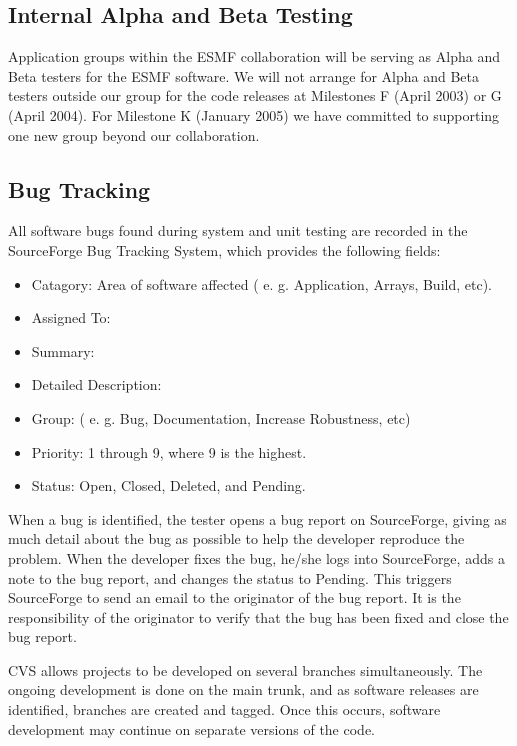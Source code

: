 \subsection{Internal Alpha and Beta Testing}

Application groups within the ESMF collaboration will be serving as Alpha 
and Beta testers for the ESMF software.  We will not arrange for Alpha
and Beta testers outside our group for the code releases at Milestones
F (April 2003) or G (April 2004).  For Milestone K (January 2005) we
have committed to supporting one new group beyond our collaboration.

\subsection{Bug Tracking}

All software bugs found during system and unit testing are recorded in the SourceForge Bug Tracking 
System, which provides the following fields:
\begin{itemize}
\item Catagory: Area of software affected ( e. g. Application, Arrays, Build, etc).
\item Assigned To: 
\item Summary:
\item Detailed Description:
\item Group: ( e. g. Bug, Documentation, Increase Robustness, etc)
\item Priority: 1 through 9, where 9 is the highest.
\item Status: Open, Closed, Deleted, and Pending.
\end{itemize}

When a bug is identified, the tester opens a bug report on SourceForge, giving as much detail
about the bug as possible to help the developer reproduce the problem. When the developer
fixes the bug, he/she logs into SourceForge, adds a note to the bug report, and changes the status
to Pending. This triggers SourceForge to send an email to the originator of the bug report. It is
the responsibility of the originator to verify that the bug has been fixed and close the bug report.

CVS allows projects to be developed on several branches simultaneously. The ongoing development
is done on the main trunk, and as software releases are identified, branches are created and tagged. Once this
occurs, software development may continue on separate versions of the code. 

